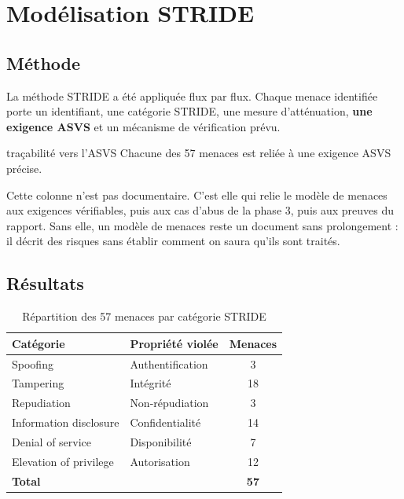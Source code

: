 \section{Modélisation STRIDE}

\subsection{Méthode}

La méthode STRIDE a été appliquée flux par flux. Chaque menace identifiée porte
un identifiant, une catégorie STRIDE, une mesure d'atténuation, \textbf{une
exigence ASVS} et un mécanisme de vérification prévu.

\begin{decision}{traçabilité vers l'ASVS}
Chacune des 57 menaces est reliée à une exigence ASVS précise.

Cette colonne n'est pas documentaire. C'est elle qui relie le modèle de menaces
aux exigences vérifiables, puis aux cas d'abus de la phase 3, puis aux preuves
du rapport. Sans elle, un modèle de menaces reste un document sans
prolongement : il décrit des risques sans établir comment on saura qu'ils sont
traités.
\end{decision}

\subsection{Résultats}

\begin{table}[H]
\centering
\caption{Répartition des 57 menaces par catégorie STRIDE}
\label{tab:stride}
\small
\begin{tabular}{@{}llc@{}}
\toprule
\textbf{Catégorie} & \textbf{Propriété violée} & \textbf{Menaces} \\
\midrule
Spoofing                & Authentification   & 3 \\
Tampering               & Intégrité          & 18 \\
Repudiation             & Non-répudiation    & 3 \\
Information disclosure  & Confidentialité    & 14 \\
Denial of service       & Disponibilité      & 7 \\
Elevation of privilege  & Autorisation       & 12 \\
\midrule
\textbf{Total}          &                    & \textbf{57} \\
\bottomrule
\end{tabular}
\end{table}

